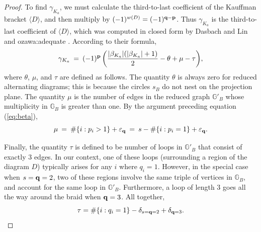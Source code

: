 \documentclass[11pt]{amsart}
\newcommand{\abs}[1]{{\left\vert #1 \right\vert}}
\newcommand{\GB}{{\mathbb{G}_B}}
\newcommand{\GRB}{{\mathbb{G}'_B}}
\newcommand{\p}{{\bf p}}
\newcommand{\q}{{\bf q}}
\newcommand{\eq}{\varepsilon_{\q}}
\theoremstyle{plain}
\theoremstyle{definition}
\begin{document}
\begin{proof}
To find $\gamma_{K_a}$, we must calculate
the third-to-last
coefficient of the Kauffman bracket $\langle D \rangle$, and then multiply by 
$(-1)^{w(D)} = (-1)^{\q-\p}$. Thus $\gamma_{K_a}$ is the third-to-last coefficient of $\langle D \rangle$, which 
was computed in closed form by Dasbach and Lin \cite[Theorem 4.1]{dasbach-lin:head-tail} and {ozawa:adequate}
 \cite[Proposition 3.3]{stoimenow:amphichiral}.
According to their formula,
\begin{equation}\label{eq:gamma}
\gamma_{K_a}\:=\:(-1)^{\p} \left( \frac{ \abs{ \beta_{K_a}} (\abs{\beta_{K_a}}+1)}{2}-\theta+\mu-\tau \right) \!,
\end{equation}
where $\theta$, $\mu$, and $\tau$ are defined as follows.
The quantity $\theta$ is always zero for reduced alternating
 diagrams; this is because the circles $s_B$ do not nest on
the projection plane.  The quantity $\mu$ is 
the number of edges in the reduced graph $\GRB$ whose multiplicity in
$\GB$ is greater than one. By the argument preceding equation (\ref{eq:beta}),
\begin{equation}\label{eq:mu}
\mu \: = \: \#\{i : p_i > 1 \} + \eq \: = \: s -   \#\{i : p_i = 1 \} + \eq.
\end{equation}

Finally, the quantity $\tau$ is
defined to be number of  loops  in $\GRB$ that consist of exactly $3$ edges. 
In our context, one of these loops (surrounding a region of the diagram $D$) 
typically arises for any $i$ where $q_i= 1$. However, in the special case when 
$s=\q=2$, two of these regions involve the same triple of vertices in $\GB$, and 
account for the same loop in $\GRB$. Furthermore, a loop of length $3$ goes all 
the way around the braid when $\q = 3$. All together,
\begin{equation}\label{eq:tau}
\tau =  \#\{i : q_i = 1 \} - \delta_{s=\q=2} + \delta_{\q = 3}.
\end{equation}


\end{proof}
\end{document}
